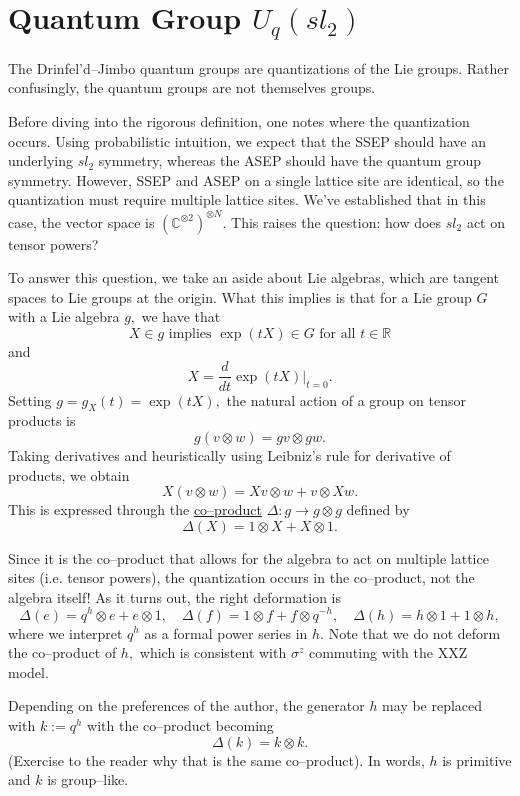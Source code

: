 \documentclass{ximera}
\begin{document}
\section{Quantum Group \(U_q(sl_2)\)}
The Drinfel'd--Jimbo quantum groups are quantizations of the Lie groups. Rather confusingly, the
quantum groups are not themselves groups. 

Before diving into the rigorous definition, one notes where the quantization occurs. Using probabilistic
intuition, we expect that the SSEP should have an underlying \(sl_2\) symmetry, whereas the
ASEP should have the quantum group symmetry. However, SSEP and ASEP on a single lattice site are
identical, so the quantization must require multiple lattice sites. We've established that in this
case, the vector space is \((\mathbb{C}^{\otimes 2})^{\otimes N}.\) This raises the question:
how does \(sl_2\) act on tensor powers?

To answer this question, we take an aside about Lie algebras, which are tangent spaces to Lie groups
at the origin. What this implies is that for a Lie group \(G\) with a Lie algebra \(g,\) we have that
\[
X \in g \text{ implies } \exp(tX) \in G \text{ for all } t\in \mathbb{R}
\]
and
\[
X = \frac{d}{dt} \exp(tX) \Big|_{t=0}.
\]
Setting \(g=g_X(t)=\exp(tX),\) the natural action of a group on tensor products is
\[
g(v \otimes w)= gv \otimes gw.
\]
Taking derivatives and heuristically using Leibniz's rule for derivative of products, we obtain
\[
X(v \otimes w) = Xv \otimes w + v \otimes Xw.
\]
This is expressed through the \underline{co--product} \(\Delta: g \rightarrow g \otimes g\) defined by 
\[
\Delta(X) = 1 \otimes X + X \otimes 1.
\]

Since it is the co--product that allows for the algebra to act on multiple lattice sites (i.e. tensor powers),
the quantization occurs in the co--product, not the algebra itself! As it turns out, the right deformation is
\[
\Delta(e) = q^h \otimes e + e \otimes 1, \quad \Delta(f) = 1 \otimes f + f \otimes q^{-h}, \quad \Delta(h)=h\otimes 1 + 1\otimes h,
\]
where we interpret \(q^h\) as a formal power series in \(h.\) Note that we do not deform the co--product
of \(h,\) which is consistent with \(\sigma^z\) commuting with the XXZ model. 

Depending on the preferences of the author, the generator \(h\) may be replaced with \(k:=q^h\) with 
the co--product becoming
\[
\Delta(k) = k \otimes k.
\]
(Exercise to the reader why that is the same co--product). In words, \(h\) is primitive and \(k\) is 
group--like.
\end{document}
